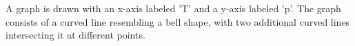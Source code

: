 A graph is drawn with an x-axis labeled 'T' and a y-axis labeled 'p'. The graph consists of a curved line resembling a bell shape, with two additional curved lines intersecting it at different points.